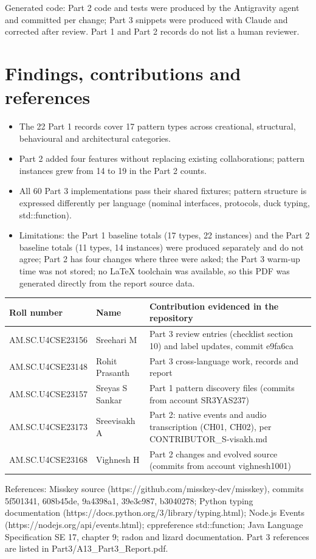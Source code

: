 \documentclass[11pt,a4paper]{article}
\begin{document}
Generated code: Part 2 code and tests were produced by the Antigravity agent and committed per change; Part 3 snippets were produced with Claude and corrected after review. Part 1 and Part 2 records do not list a human reviewer.

\section{Findings, contributions and references}
\begin{itemize}
\item The 22 Part 1 records cover 17 pattern types across creational, structural, behavioural and architectural categories.
\item Part 2 added four features without replacing existing collaborations; pattern instances grew from 14 to 19 in the Part 2 counts.
\item All 60 Part 3 implementations pass their shared fixtures; pattern structure is expressed differently per language (nominal interfaces, protocols, duck typing, std::function).
\item Limitations: the Part 1 baseline totals (17 types, 22 instances) and the Part 2 baseline totals (11 types, 14 instances) were produced separately and do not agree; Part 2 has four changes where three were asked; the Part 3 warm-up time was not stored; no LaTeX toolchain was available, so this PDF was generated directly from the report source data.
\end{itemize}
{\small\begin{tabularx}{\linewidth}{llX}\toprule
Roll number & Name & Contribution evidenced in the repository\\\midrule
AM.SC.U4CSE23156 & Sreehari M & Part 3 review entries (checklist section 10) and label updates, commit e9fa6ca \\
AM.SC.U4CSE23148 & Rohit Prasanth & Part 3 cross-language work, records and report \\
AM.SC.U4CSE23157 & Sreyas S Sankar & Part 1 pattern discovery files (commits from account SR3YAS237) \\
AM.SC.U4CSE23173 & Sreevisakh A & Part 2: native events and audio transcription (CH01, CH02), per CONTRIBUTOR\_S-visakh.md \\
AM.SC.U4CSE23168 & Vighnesh H & Part 2 changes and evolved source (commits from account vighnesh1001)\\
\bottomrule\end{tabularx}}

References: Misskey source (https://github.com/misskey-dev/misskey), commits 5f501341, 608b45de, 9a4398a1, 39e3c987, b3040278; Python typing documentation (https://docs.python.org/3/library/typing.html); Node.js Events (https://nodejs.org/api/events.html); cppreference std::function; Java Language Specification SE 17, chapter 9; radon and lizard documentation. Part 3 references are listed in Part3/A13\_Part3\_Report.pdf.
\end{document}
